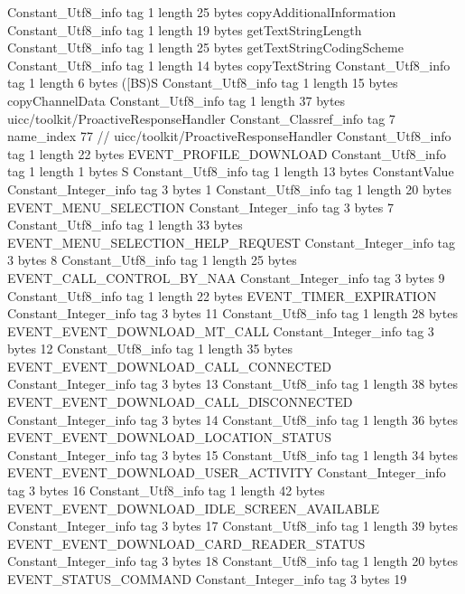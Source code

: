 {{{		}
		Constant_Utf8_info {
			tag	1
			length	25
			bytes	copyAdditionalInformation
		}
		Constant_Utf8_info {
			tag	1
			length	19
			bytes	getTextStringLength
		}
		Constant_Utf8_info {
			tag	1
			length	25
			bytes	getTextStringCodingScheme
		}
		Constant_Utf8_info {
			tag	1
			length	14
			bytes	copyTextString
		}
		Constant_Utf8_info {
			tag	1
			length	6
			bytes	([BS)S
		}
		Constant_Utf8_info {
			tag	1
			length	15
			bytes	copyChannelData
		}
		Constant_Utf8_info {
			tag	1
			length	37
			bytes	uicc/toolkit/ProactiveResponseHandler
		}
		Constant_Classref_info {
			tag	7
			name_index	77		// uicc/toolkit/ProactiveResponseHandler
		}
		Constant_Utf8_info {
			tag	1
			length	22
			bytes	EVENT_PROFILE_DOWNLOAD
		}
		Constant_Utf8_info {
			tag	1
			length	1
			bytes	S
		}
		Constant_Utf8_info {
			tag	1
			length	13
			bytes	ConstantValue
		}
		Constant_Integer_info {
			tag	3
			bytes	1
		}
		Constant_Utf8_info {
			tag	1
			length	20
			bytes	EVENT_MENU_SELECTION
		}
		Constant_Integer_info {
			tag	3
			bytes	7
		}
		Constant_Utf8_info {
			tag	1
			length	33
			bytes	EVENT_MENU_SELECTION_HELP_REQUEST
		}
		Constant_Integer_info {
			tag	3
			bytes	8
		}
		Constant_Utf8_info {
			tag	1
			length	25
			bytes	EVENT_CALL_CONTROL_BY_NAA
		}
		Constant_Integer_info {
			tag	3
			bytes	9
		}
		Constant_Utf8_info {
			tag	1
			length	22
			bytes	EVENT_TIMER_EXPIRATION
		}
		Constant_Integer_info {
			tag	3
			bytes	11
		}
		Constant_Utf8_info {
			tag	1
			length	28
			bytes	EVENT_EVENT_DOWNLOAD_MT_CALL
		}
		Constant_Integer_info {
			tag	3
			bytes	12
		}
		Constant_Utf8_info {
			tag	1
			length	35
			bytes	EVENT_EVENT_DOWNLOAD_CALL_CONNECTED
		}
		Constant_Integer_info {
			tag	3
			bytes	13
		}
		Constant_Utf8_info {
			tag	1
			length	38
			bytes	EVENT_EVENT_DOWNLOAD_CALL_DISCONNECTED
		}
		Constant_Integer_info {
			tag	3
			bytes	14
		}
		Constant_Utf8_info {
			tag	1
			length	36
			bytes	EVENT_EVENT_DOWNLOAD_LOCATION_STATUS
		}
		Constant_Integer_info {
			tag	3
			bytes	15
		}
		Constant_Utf8_info {
			tag	1
			length	34
			bytes	EVENT_EVENT_DOWNLOAD_USER_ACTIVITY
		}
		Constant_Integer_info {
			tag	3
			bytes	16
		}
		Constant_Utf8_info {
			tag	1
			length	42
			bytes	EVENT_EVENT_DOWNLOAD_IDLE_SCREEN_AVAILABLE
		}
		Constant_Integer_info {
			tag	3
			bytes	17
		}
		Constant_Utf8_info {
			tag	1
			length	39
			bytes	EVENT_EVENT_DOWNLOAD_CARD_READER_STATUS
		}
		Constant_Integer_info {
			tag	3
			bytes	18
		}
		Constant_Utf8_info {
			tag	1
			length	20
			bytes	EVENT_STATUS_COMMAND
		}
		Constant_Integer_info {
			tag	3
			bytes	19
}}}
